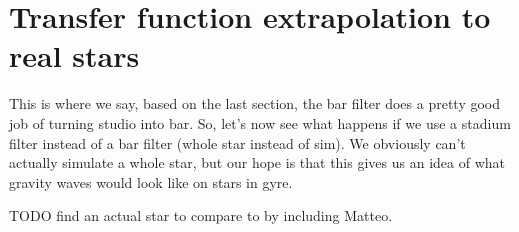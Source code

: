 \section{Transfer function extrapolation to real stars}
\label{sec:transfer_extrapolation}

This is where we say, based on the last section, the bar filter does a pretty good job of turning studio into bar.
So, let's now see what happens if we use a stadium filter instead of a bar filter (whole star instead of sim).
We obviously can't actually simulate a whole star, but our hope is that this gives us an idea of what gravity waves would look like on stars in gyre.

TODO find an actual star to compare to by including Matteo.
